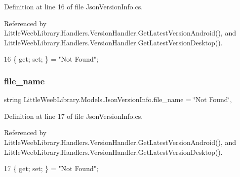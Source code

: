 Definition at line 16 of file Json\+Version\+Info.\+cs.



Referenced by Little\+Weeb\+Library.\+Handlers.\+Version\+Handler.\+Get\+Latest\+Version\+Android(), and Little\+Weeb\+Library.\+Handlers.\+Version\+Handler.\+Get\+Latest\+Version\+Desktop().


\begin{DoxyCode}
16 \{ \textcolor{keyword}{get}; \textcolor{keyword}{set}; \} = \textcolor{stringliteral}{"Not Found"};
\end{DoxyCode}
\mbox{\label{class_little_weeb_library_1_1_models_1_1_json_version_info_a71865be74ad7d0a178a81b708ea85d25}} 
\subsubsection{\texorpdfstring{file\+\_\+name}{file\_name}}
{\footnotesize\ttfamily string Little\+Weeb\+Library.\+Models.\+Json\+Version\+Info.\+file\+\_\+name = \char`\"{}Not Found\char`\"{}\hspace{0.3cm}{\ttfamily [get]}, {\ttfamily [set]}}



Definition at line 17 of file Json\+Version\+Info.\+cs.



Referenced by Little\+Weeb\+Library.\+Handlers.\+Version\+Handler.\+Get\+Latest\+Version\+Android(), and Little\+Weeb\+Library.\+Handlers.\+Version\+Handler.\+Get\+Latest\+Version\+Desktop().


\begin{DoxyCode}
17 \{ \textcolor{keyword}{get}; \textcolor{keyword}{set}; \} = \textcolor{stringliteral}{"Not Found"};
\end{DoxyCode}
\mbox{\label{class_little_weeb_library_1_1_models_1_1_json_version_info_a836f97d258ddad4ab351b8cd06730914}} 
